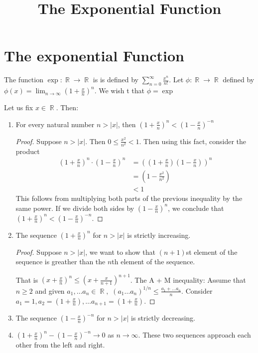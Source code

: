 \documentclass[a4paper, 11pt]{article}
\title{The Exponential Function}
\DeclareMathOperator{\R}{\mathbb{R}}
\begin{document}
\tableofcontents
\section{The exponential Function}
\begin{definition} 
The function $\exp: \R \rightarrow \R$ is  is defined by $\sum_{n=0}^{\infty}\frac{x^{n}}{{n}!}$. 
Let $\phi: \R \rightarrow \R$ defined by $\phi(x) = \lim_{n\rightarrow \infty} \left( 1 + \frac{x}{n} \right)^n$.
We wish t that $\phi = \exp$
\end{definition}

\begin{proposition}
Let us fix $x \in \R$. Then:
\begin{enumerate}
  \item For every natural number $n > |x|$, then $\left(1 + \frac{x}{n}\right)^{n} < (1 - \frac{x}{n})^{-n}$
  \begin{proof}
    Suppose $n > |x|$. Then $0 \leq \frac{x^{2}}{n^{2}}<1$. Then using this fact,
    consider the product 
    \begin{align*}
      \left(1 + \frac{x}{n}\right)^n \cdot \left(1 - \frac{x}{n}\right)^n
      &= \left(\left(1 + \frac{x}{n}\right)\left(1 - \frac{x}{n}\right)\right)^n \\
      &=\left(1 - \frac{x^2}{n^2}\right) \\
      &<1
    \end{align*}
    This follows from multiplying both parts of the previous inequality by the same power. If we divide
    both sides by $\left(1 - \frac{x}{n}\right)^n$, we conclude that $\left(1 + \frac{x}{n}\right)^n  < \left(1 - \frac{x}{n}\right)^{-n}$.
    
  \end{proof}
  \item The sequence $\left(1 + \frac{x}{n}\right)^n$ for $n > |x|$ is strictly increasing.
  \begin{proof}
  Suppose $n > |x|$, we want to show that $(n + 1)$st element of the sequence is greather than the $n$th element of the sequence.

  That is $\left(x + \frac{x}{n}\right)^n \leq \left(x + \frac{x}{n+1}\right)^{n + 1}$. The A + M inequality:
  Assume that $n \geq2 $ and given $a_1, \dots a_n \in \R,$ $(a_1 \dots a_n)^{1/n} \leq \frac{a_1 + \dots a_n}{n}$.
  Consider $a_1 = 1, a_2 = \left(1 + \frac{x}{n}\right), \dots a_{n+1} = \left(1 + \frac{x}{n}\right)$.
  \end{proof}
  \item The sequence $\left(1 - \frac{x}{n}\right)^{-n}$ for $n > |x|$ is strictly decreasing.
  \item $\left(1 + \frac{x}{n}\right)^{n} - \left(1 - \frac{x}{n}\right)^{-n} \rightarrow 0$ as $n \rightarrow \infty$.
  These two sequences approach each other from the left and right. 
\end{enumerate}
\end{proposition}
\end{document}
